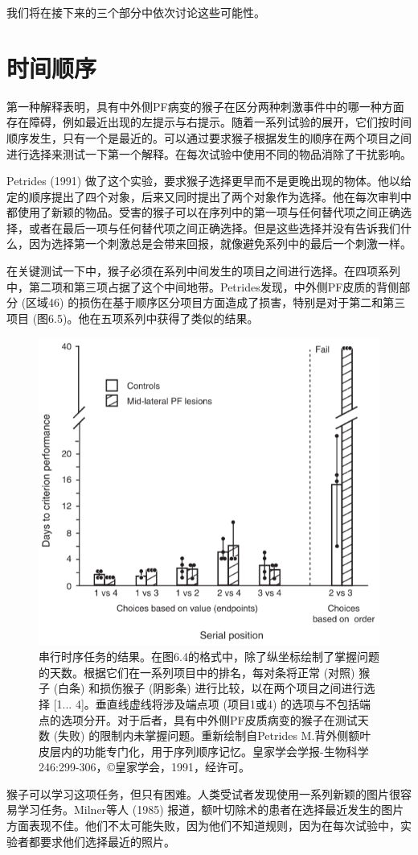 我们将在接下来的三个部分中依次讨论这些可能性。

\section{时间顺序}
第一种解释表明，具有中外侧PF病变的猴子在区分两种刺激事件中的哪一种方面存在障碍，例如最近出现的左提示与右提示。随着一系列试验的展开，它们按时间顺序发生，只有一个是最近的。可以通过要求猴子根据发生的顺序在两个项目之间进行选择来测试一下第一个解释。在每次试验中使用不同的物品消除了干扰影响。

Petrides (1991) 做了这个实验，要求猴子选择更早而不是更晚出现的物体。他以给定的顺序提出了四个对象，后来又同时提出了两个对象作为选择。他在每次审判中都使用了新颖的物品。受害的猴子可以在序列中的第一项与任何替代项之间正确选择，或者在最后一项与任何替代项之间正确选择。但是这些选择并没有告诉我们什么，因为选择第一个刺激总是会带来回报，就像避免系列中的最后一个刺激一样。

在关键测试一下中，猴子必须在系列中间发生的项目之间进行选择。在四项系列中，第二项和第三项占据了这个中间地带。Petrides发现，中外侧PF皮质的背侧部分 (区域46) 的损伤在基于顺序区分项目方面造成了损害，特别是对于第二和第三项目 (图6.5)。他在五项系列中获得了类似的结果。
\begin{figure}
	\centering
	\includegraphics[width=0.5\linewidth]{image_pfc/Fig_6_5}
	\caption{串行时序任务的结果。在图6.4的格式中，除了纵坐标绘制了掌握问题的天数。根据它们在一系列项目中的排名，每对条将正常 (对照) 猴子 (白条) 和损伤猴子 (阴影条) 进行比较，以在两个项目之间进行选择 [1... 4]。垂直线虚线将涉及端点项 (项目1或4) 的选项与不包括端点的选项分开。对于后者，具有中外侧PF皮质病变的猴子在测试天数 (失败) 的限制内未掌握问题。重新绘制自Petrides M.背外侧额叶皮层内的功能专门化，用于序列顺序记忆。皇家学会学报-生物科学246:299-306，©皇家学会，1991，经许可。}
	\label{fig:fig}
\end{figure}
猴子可以学习这项任务，但只有困难。人类受试者发现使用一系列新颖的图片很容易学习任务。Milner等人 (1985) 报道，额叶切除术的患者在选择最近发生的图片方面表现不佳。他们不太可能失败，因为他们不知道规则，因为在每次试验中，实验者都要求他们选择最近的照片。


